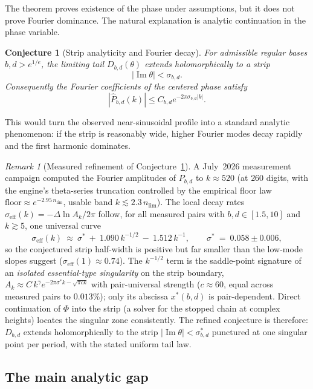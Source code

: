 \documentclass[11pt,a4paper]{article}
\theoremstyle{plain}
\newtheorem{conjecture}[theorem]{Conjecture}
\theoremstyle{definition}
\theoremstyle{remark}
\newtheorem{remark}[theorem]{Remark}
\begin{document}
The theorem proves existence of the phase under assumptions, but it does not prove Fourier dominance.  The natural explanation is analytic continuation in the phase variable.

\begin{conjecture}[Strip analyticity and Fourier decay]\label{conj:strip}
For admissible regular bases $b,d>e^{1/e}$, the limiting tail $D_{b,d}(\theta)$ extends holomorphically to a strip
\[
  |\operatorname{Im}\theta|<\sigma_{b,d}.
\]
Consequently the Fourier coefficients of the centered phase satisfy
\[
  |\widehat P_{b,d}(k)|\leq C_{b,d}e^{-2\pi\sigma_{b,d}|k|}.
\]
\end{conjecture}

This would turn the observed near-sinusoidal profile into a standard analytic phenomenon: if the strip is reasonably wide, higher Fourier modes decay rapidly and the first harmonic dominates.

\begin{remark}[Measured refinement of Conjecture~\ref{conj:strip}]\label{rem:strip-measured}
A July~2026 measurement campaign computed the Fourier amplitudes of
$P_{b,d}$ to $k\approx520$ (at $260$ digits, with the engine's theta-series
truncation controlled by the empirical floor law
$\mathrm{floor}\approx e^{-2.95\,n_{\lim}}$, usable band $k\lesssim2.3\,
n_{\lim}$).  The local decay rates
$\sigma_{\mathrm{eff}}(k)=-\Delta\ln A_k/2\pi$ follow, for all measured
pairs with $b,d\in[1.5,10]$ and $k\gtrsim5$, one universal curve
\[
  \sigma_{\mathrm{eff}}(k)\ \approx\ \sigma^*\ +\ 1.090\,k^{-1/2}\ -\ 1.512\,k^{-1},
  \qquad \sigma^*\ =\ 0.058\pm0.006 ,
\]
so the conjectured strip half-width is positive but far smaller than the
low-mode slopes suggest ($\sigma_{\mathrm{eff}}(1)\approx0.74$).  The
$k^{-1/2}$ term is the saddle-point signature of an \emph{isolated
essential-type singularity} on the strip boundary,
$A_k\approx C\,k^{\gamma}e^{-2\pi\sigma^*k-\sqrt{\pi c k}}$ with
pair-universal strength ($c\approx60$, equal across measured pairs to
$0.013\%$); only its abscissa $x^*(b,d)$ is pair-dependent.  Direct
continuation of $\Phi$ into the strip (a solver for the stopped chain at
complex heights) locates the singular zone consistently.  The refined
conjecture is therefore: $D_{b,d}$ extends holomorphically to the strip
$|\operatorname{Im}\theta|<\sigma^*_{b,d}$ punctured at one singular point
per period, with the stated uniform tail law.
\end{remark}

\subsection{The main analytic gap}
\end{document}
